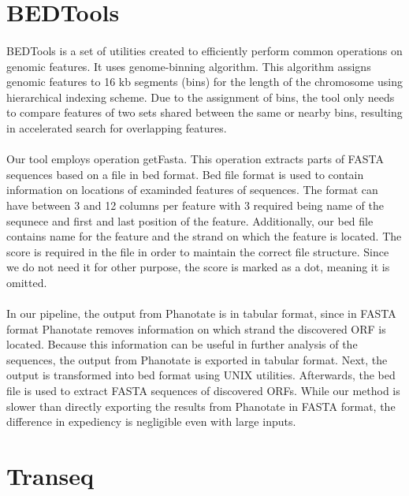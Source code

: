 \section{BEDTools}
\paragraph*{}
BEDTools is a set of utilities created to efficiently perform common operations on genomic features. It uses genome-binning algorithm. This algorithm assigns genomic features to 16 kb segments (bins) for the length of the chromosome using hierarchical indexing scheme. Due to the assignment of bins, the tool only needs to compare features of two sets shared between the same or nearby bins, resulting in accelerated search for overlapping features.
\paragraph*{}
Our tool employs operation getFasta. This operation extracts parts of FASTA sequences based on a file in bed format. Bed file format is used to contain information on locations of examinded features of sequences. The format can have between 3 and 12 columns per feature with 3 required being name of the sequnece and first and last position of the feature. Additionally, our bed file contains name for the feature and the strand on which the feature is located. The score is required in the file in order to maintain the correct file structure. Since we do not need it for other purpose, the score is marked as a dot, meaning it is omitted.
\paragraph*{}
In our pipeline, the output from Phanotate is in tabular format, since in FASTA format Phanotate removes information on which strand the discovered ORF is located. Because this information can be useful in further analysis of the sequences, the output from Phanotate is exported in tabular format. Next, the output is transformed into bed format using UNIX utilities. Afterwards, the bed file is used to extract FASTA sequences of discovered ORFs. While our method is slower than directly exporting the results from Phanotate in FASTA format, the difference in expediency is negligible even with large inputs.

\section{Transeq}
